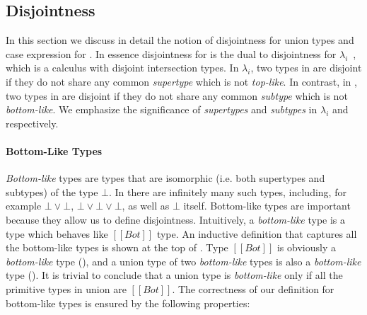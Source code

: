 \subsection{Disjointness}
\label{sec:union:disj}
In this section we discuss in detail the notion of disjointness for
union types and case expression for \cal. In essence disjointness for \cal is
the dual to disjointness for $\lambda_i$~\cite{oliveira2016disjoint}, which is
a calculus with disjoint intersection types. In $\lambda_i$, two
types in are disjoint if they do not share any common
\emph{supertype} which is not \emph{top-like}. In contrast, in
\cal, two types in are disjoint if they do not share any common \emph{subtype} which
is not \emph{bottom-like}.
We emphasize the significance of
\emph{supertypes} and \emph{subtypes} in $\lambda_i$ and \cal
respectively.

\paragraph{Bottom-Like Types}
\emph{Bottom-like} types are types that are isomorphic (i.e.
both supertypes and subtypes) of the type $\bot$. In \name there
are infinitely many such types, including, for example $\bot \lor \bot$,
$\bot \lor \bot \lor \bot$, as well as $\bot$ itself. Bottom-like types
are important because they allow us to define disjointness.
Intuitively, a
\emph{bottom-like} type is a type which behaves like $[[Bot]]$ type.
An inductive definition that captures all the bottom-like types
is shown at the top of .
Type $[[Bot]]$ is obviously a \emph{bottom-like} type
(), and a union type of two \emph{bottom-like} types is also
a \emph{bottom-like} type ().  It is trivial to conclude
that a union type is \emph{bottom-like} only if all the primitive
types in union are $[[Bot]]$. The correctness of our definition for
bottom-like types is ensured by the following properties:

